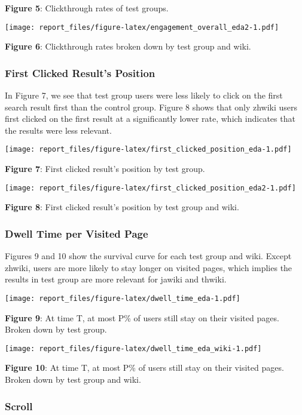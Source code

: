 \documentclass[12pt,]{article}
\begin{document}
\textbf{Figure 5}: Clickthrough rates of test groups.

\texttt{[image: report\_files/figure-latex/engagement\_overall\_eda2-1.pdf]}

\textbf{Figure 6}: Clickthrough rates broken down by test group and
wiki.

\subsubsection{First Clicked Result's
Position}\label{first-clicked-results-position}

In Figure 7, we see that test group users were less likely to click on
the first search result first than the control group. Figure 8 shows
that only zhwiki users first clicked on the first result at a
significantly lower rate, which indicates that the results were less
relevant.

\texttt{[image: report\_files/figure-latex/first\_clicked\_position\_eda-1.pdf]}

\textbf{Figure 7}: First clicked result's position by test group.

\texttt{[image: report\_files/figure-latex/first\_clicked\_position\_eda2-1.pdf]}

\textbf{Figure 8}: First clicked result's position by test group and
wiki.

\subsubsection{Dwell Time per Visited
Page}\label{dwell-time-per-visited-page}

Figures 9 and 10 show the survival curve for each test group and wiki.
Except zhwiki, users are more likely to stay longer on visited pages,
which implies the results in test group are more relevant for jawiki and
thwiki.

\texttt{[image: report\_files/figure-latex/dwell\_time\_eda-1.pdf]}

\textbf{Figure 9}: At time T, at most P\% of users still stay on their
visited pages. Broken down by test group.

\texttt{[image: report\_files/figure-latex/dwell\_time\_eda\_wiki-1.pdf]}

\textbf{Figure 10}: At time T, at most P\% of users still stay on their
visited pages. Broken down by test group and wiki.

\subsubsection{Scroll}\label{scroll}
\end{document}
